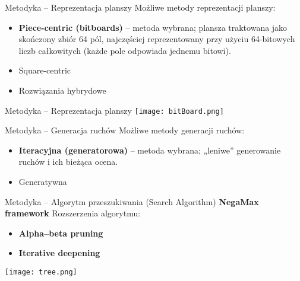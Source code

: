 \documentclass[aspectratio=1610, english]{beamer}
\begin{document}

\begin{frame}{Metodyka – Reprezentacja planszy}
    Możliwe metody reprezentacji planszy:
    \newline
    \begin{itemize}
        \item \textbf{Piece-centric (bitboards)} – metoda wybrana; plansza traktowana jako skończony zbiór 64 pól,
        najczęściej reprezentowany przy użyciu 64-bitowych liczb całkowitych (każde pole odpowiada jednemu bitowi).
        \newline 
        \item Square-centric
        \newline
        \item Rozwiązania hybrydowe
    \end{itemize}
\end{frame}

\begin{frame}{Metodyka – Reprezentacja planszy}
    \texttt{[image: bitBoard.png]}
\end{frame}


\begin{frame}{Metodyka – Generacja ruchów}
    Możliwe metody generacji ruchów:
    \newline
    \begin{itemize}
        \item \textbf{Iteracyjna (generatorowa)} – metoda wybrana; „leniwe” generowanie ruchów i ich bieżąca ocena.
        \newline 
        \item Generatywna
    \end{itemize}
\end{frame}


\begin{frame}{Metodyka – Algorytm przeszukiwania (Search Algorithm)}
    \textbf{NegaMax framework}
    \newline
    Rozszerzenia algorytmu:
    \newline 
    \begin{itemize}
        \item \textbf{Alpha–beta pruning}
        \newline 
        \item \textbf{Iterative deepening}
    \end{itemize}
    \begin{center}
        \texttt{[image: tree.png]}
    \end{center}
\end{frame}
\end{document}
